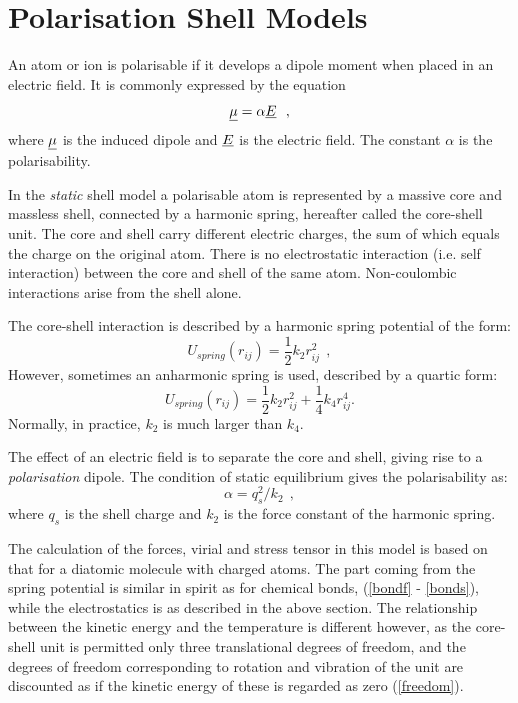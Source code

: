 \section{Polarisation Shell Models}

An atom or ion is polarisable if it develops a
dipole moment when placed in an electric field.  It is commonly
expressed by the equation
\begin{equation}
\mbox{$\underline{\mu}$} = \alpha \mbox{$\underline{E}$}~~,
\end{equation}
where $\mbox{$\underline{\mu}$}$ is the induced dipole and $\mbox{$\underline{E}$}$ is the
electric field.  The constant $\alpha$ is the polarisability.

In the {\em static} shell model a
polarisable atom is represented by
a massive core and massless shell, connected by a harmonic spring,
hereafter called the core-shell unit.  The core and shell carry
different electric charges, the sum of which equals the charge on
the original atom.  There is no electrostatic interaction (i.e.
self interaction) between the core and shell of the same atom.
Non-coulombic interactions arise from the shell alone.

The core-shell interaction is described by a harmonic spring
potential of the form:
\begin{equation}
U_{spring}(r_{ij})=\frac{1}{2}k_{2} r_{ij}^{2}~~,
\end{equation}
However, sometimes an anharmonic spring is used, described by a
quartic form:
\begin{equation}
U_{spring}(r_{ij})=\frac{1}{2}k_{2} r_{ij}^{2}+\frac{1}{4}k_{4} r_{ij}^{4}.
\end{equation}
Normally, in practice, $k_{2}$ is much larger than $k_{4}$.

The effect of an electric field is to separate the core and shell,
giving rise to a {\em polarisation} dipole.  The condition of
static equilibrium gives the polarisability as:
\begin{equation}
\alpha = q_{s}^{2}/k_{2}~~,
\end{equation}
where $q_{s}$ is the shell charge and $k_{2}$ is the force
constant of the harmonic spring.

The calculation of the forces, virial and stress tensor in this model is based on that for a diatomic molecule
with charged atoms.  The part coming from the spring potential is
similar in spirit as for chemical bonds, (\ref{bondf} - \ref{bonds}),
while the electrostatics is as described in the above section.
The relationship between the kinetic energy and the temperature is
different however, as the core-shell unit is permitted only three
translational degrees of freedom, and the degrees of freedom
corresponding to rotation and vibration of the unit are discounted
as if the kinetic energy of these is regarded as zero (\ref{freedom}).

